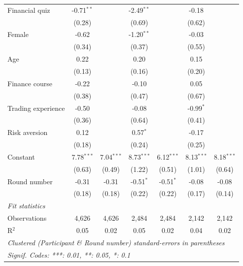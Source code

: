 \begin{table}[htbp]
\begin{tabular}{lcccccc}
      Financial quiz     & -0.71$^{**}$  &               & -2.49$^{**}$  &               & -0.18         &   \\   
                         & (0.28)        &               & (0.69)        &               & (0.62)        &   \\   
      Female             & -0.62         &               & -1.20$^{**}$  &               & -0.03         &   \\   
                         & (0.34)        &               & (0.37)        &               & (0.55)        &   \\   
      Age                & 0.22          &               & 0.20          &               & 0.15          &   \\   
                         & (0.13)        &               & (0.16)        &               & (0.20)        &   \\   
      Finance course     & -0.22         &               & -0.10         &               & 0.05          &   \\   
                         & (0.38)        &               & (0.47)        &               & (0.67)        &   \\   
      Trading experience & -0.50         &               & -0.08         &               & -0.99$^{*}$   &   \\   
                         & (0.36)        &               & (0.64)        &               & (0.41)        &   \\   
      Risk aversion      & 0.12          &               & 0.57$^{*}$    &               & -0.17         &   \\   
                         & (0.18)        &               & (0.24)        &               & (0.25)        &   \\   
      Constant           & 7.78$^{***}$  & 7.04$^{***}$  & 8.73$^{***}$  & 6.12$^{***}$  & 8.13$^{***}$  & 8.18$^{***}$\\   
                         & (0.63)        & (0.49)        & (1.22)        & (0.51)        & (1.01)        & (0.64)\\   
      Round number       & -0.31         & -0.31         & -0.51$^{*}$   & -0.51$^{*}$   & -0.08         & -0.08\\   
                         & (0.18)        & (0.18)        & (0.22)        & (0.22)        & (0.17)        & (0.14)\\   
      \midrule
      \emph{Fit statistics}\\
      Observations       & 4,626         & 4,626         & 2,484         & 2,484         & 2,142         & 2,142\\  
      R$^2$              & 0.05          & 0.02          & 0.05          & 0.02          & 0.04          & 0.02\\  
      \midrule \midrule
      \multicolumn{7}{l}{\emph{Clustered (Participant \& Round number) standard-errors in parentheses}}\\
      \multicolumn{7}{l}{\emph{Signif. Codes: ***: 0.01, **: 0.05, *: 0.1}}\\
   \end{tabular}
\end{table}
